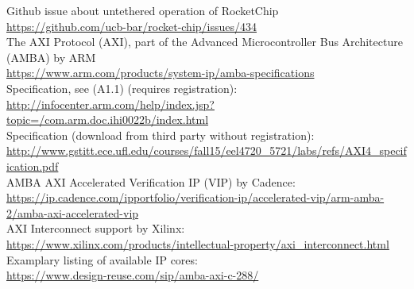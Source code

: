 \documentclass[journal,a4paper]{IEEEtran}
\begin{document}
\begin{thebibliography}{1}
	Github issue about untethered operation of RocketChip\\
	\url{https://github.com/ucb-bar/rocket-chip/issues/434}\\

	The AXI Protocol (AXI), part of the Advanced Microcontroller Bus Architecture (AMBA) by ARM\\
	\url{https://www.arm.com/products/system-ip/amba-specifications}\\
	Specification, see (A1.1) (requires registration):\\
	\url{http://infocenter.arm.com/help/index.jsp?topic=/com.arm.doc.ihi0022b/index.html}\\
	Specification (download from third party without registration):\\
	\url{http://www.gstitt.ece.ufl.edu/courses/fall15/eel4720_5721/labs/refs/AXI4_specification.pdf}\\

	AMBA AXI Accelerated Verification IP (VIP) by Cadence:\\
	\url{https://ip.cadence.com/ipportfolio/verification-ip/accelerated-vip/arm-amba-2/amba-axi-accelerated-vip}\\
	AXI Interconnect support by Xilinx:\\
	\url{https://www.xilinx.com/products/intellectual-property/axi_interconnect.html}\\
	Examplary listing of available IP cores:\\
	\url{https://www.design-reuse.com/sip/amba-axi-c-288/}\\



\end{thebibliography}
\enlargethispage{-5in}
\end{document}
